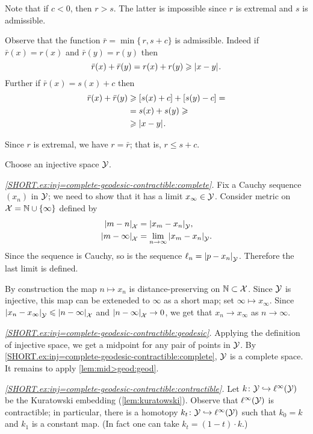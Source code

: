 Note that if $c<0$, then $r>s$.
The latter is impossible since $r$ is extremal and $s$ is admissible.

Observe that the function $\bar r=\min\{\,r,s+c\}$ is admissible.
Indeed if $\bar r(x)=r(x)$ and $\bar r(y)=r(y)$ then 
\[\bar r(x)+\bar r(y)=r(x)+ r(y)\ge \dist{x}{y}{}.\]
Further if $\bar r(x)=s(x)+c$ then 
\begin{align*}
\bar r(x)+\bar r(y)&\ge [s(x)+c]+ [s(y)-c]= 
\\
&=s(x)+s(y) \ge 
\\
&\ge\dist{x}{y}{}.
\end{align*}

Since $r$ is extremal, we have $r=\bar r$;
that is, $r\le s+c$.

Choose an injective space $\mathcal{Y}$.

\textit{\ref{SHORT.ex:inj=complete-geodesic-contractible:complete}.}
Fix a Cauchy sequence $(x_n)$ in $\mathcal{Y}$;
we need to show that it has a limit $x_\infty\in \mathcal{Y}$.
Consider metric on $\mathcal{X}=\mathbb{N}\cup\{\infty\}$ defined by 
\begin{align*}
\dist{m}{n}{\spc{X}}&=\dist{x_m}{x_n}{\spc{Y}},
\\
\dist{m}{\infty}{\spc{X}}&=\lim_{n\to\infty}\dist{x_m}{x_n}{\spc{Y}}.
\end{align*}
Since the sequence is Cauchy, so is the sequence $\ell_n=\dist{p}{x_n}{\spc{Y}}$.
Therefore the last limit is defined.

By construction the map $n\mapsto x_n$ is distance-preserving on $\mathbb{N}\subset \mathcal{X}$.
Since $\mathcal{Y}$ is injective, this map can be exteneded to $\infty$ as a short map; set $\infty\mapsto x_\infty$.
Since $\dist{x_n}{x_\infty}{\spc{Y}}\le \dist{n}{\infty}{\spc{X}}$ 
and $\dist{n}{\infty}{\spc{X}}\to 0$, we get that
$x_n\to x_\infty$ as $n\to\infty$.

\textit{\ref{SHORT.ex:inj=complete-geodesic-contractible:geodesic}.}
Applying the definition of injective space, we get a midpoint for any pair of points in $\mathcal{Y}$.
By \ref{SHORT.ex:inj=complete-geodesic-contractible:complete},
$\mathcal{Y}$ is a complete space.
It remains to apply \ref{lem:mid>geod:geod}.

\textit{\ref{SHORT.ex:inj=complete-geodesic-contractible:contractible}.}
Let $k\colon\mathcal{Y}\hookrightarrow \ell^\infty(\mathcal{Y})$ be the Kuratowski embedding (\ref{lem:kuratowski}).
Observe that $\ell^\infty(\mathcal{Y})$ is contractible;
in particular, there is a homotopy $k_t\colon\mathcal{Y}\hookrightarrow \ell^\infty(\mathcal{Y})$ such that $k_0=k$ and $k_1$ is a constant map.
(In fact one can take $k_t=(1-t)\cdot k$.)

